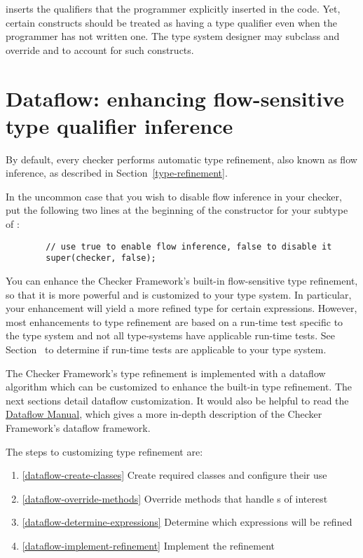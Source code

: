  inserts the qualifiers that the programmer
explicitly inserted in the code.  Yet, certain constructs should be
treated as having a type qualifier even when the programmer has not
written one.  The type system designer may subclass
 and override
 and
 to account for
such constructs.


\section{Dataflow: enhancing flow-sensitive type qualifier inference\label{dataflow}}

By default, every checker performs automatic type refinement, also known as
flow inference, as described
in Section~\ref{type-refinement}.

In the uncommon case that you wish to disable flow inference in your
checker, put the following two lines at the beginning of the constructor
for your subtype of
:

\begin{Verbatim}
        // use true to enable flow inference, false to disable it
        super(checker, false);
\end{Verbatim}

You can enhance the Checker Framework's built-in flow-sensitive type refinement,
so that it is more powerful and is customized to your type system. In
particular, your enhancement will yield a more refined type for certain
expressions. However, most enhancements to type refinement are based on a
run-time test specific to the type system and not all type-systems have
applicable run-time tests.  See
Section~ to determine if
run-time tests are applicable to your type system.

The Checker Framework's type refinement is implemented with a dataflow algorithm
which can be customized to enhance the built-in type refinement. The next
sections detail dataflow customization.  It would also be helpful to read the
\href{http://types.cs.washington.edu/checker-framework/current/checker-framework-dataflow-manual.pdf}
{Dataflow Manual}, which gives a more in-depth description of the Checker
Framework's dataflow framework.

The steps to customizing type refinement are:
\begin{enumerate}
\item{\ref{dataflow-create-classes}} Create required classes and configure their
    use
\item{\ref{dataflow-override-methods}} Override methods that handle
    s of interest
\item{\ref{dataflow-determine-expressions}} Determine which expressions will be
    refined
\item{\ref{dataflow-implement-refinement}} Implement the refinement
\end{enumerate}

